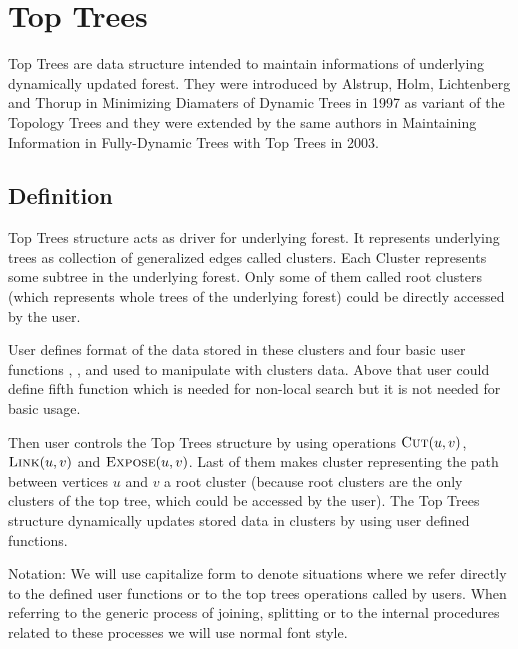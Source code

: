 \chapter{Top Trees}
\label{chap:TopTrees}

Top Trees are data structure intended to maintain informations of underlying
dynamically updated forest. They were introduced by Alstrup, Holm, Lichtenberg
and Thorup in {\I Minimizing Diamaters of Dynamic Trees}
\cite{MinimizingDiamatersOfDynamicTrees} in 1997 as variant of the Topology
Trees and they were extended by the same authors in
{\I Maintaining Information in Fully-Dynamic Trees with Top Trees} \cite{TopTrees} in 2003.

\section{Definition}

{\I Top Trees structure} acts as driver for underlying forest. It represents
underlying trees as collection of generalized edges called {\I clusters}. Each
{\I Cluster} represents some subtree in the underlying forest. Only
some of them called {\I root clusters} (which represents whole trees of the
underlying forest) could be directly accessed by the user.

User defines format of the data stored in these clusters and four basic
{\I user functions} \Create, \Destroy, \Join{} and \Split{} used to
manipulate with clusters data. Above that user could define fifth function
\Choose{} which is needed for non-local search but it is not needed for basic
usage.

Then user controls the Top Trees structure by using {\I operations} $\hbox{\sc Cut}(u,v)$,
$\hbox{\sc Link}(u,v)$ and $\hbox{\sc Expose}(u,v)$. Last of them
makes cluster representing the path between vertices $u$ and $v$ a root cluster
(because root clusters are the only clusters of the top tree, which could be
accessed by the user). The Top Trees structure dynamically updates stored data
in clusters by using user defined functions.

{\I Notation: We will use capitalize form to denote situations where we refer
directly to the defined user functions or to the top trees operations called by
users. When referring to the generic process of joining, splitting or to the
internal procedures related to these processes we will use normal font style.}



